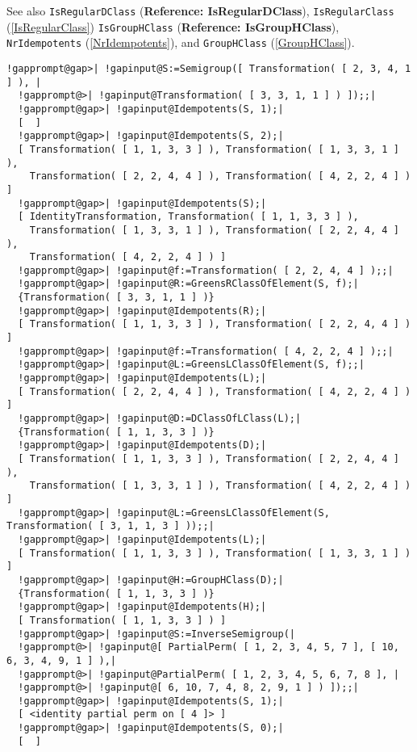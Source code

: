 \documentclass[a4paper,11pt]{report}
\begin{document}
{{{ See also \texttt{IsRegularDClass} (\textbf{Reference: IsRegularDClass}), \texttt{IsRegularClass} (\ref{IsRegularClass}) \texttt{IsGroupHClass} (\textbf{Reference: IsGroupHClass}), \texttt{NrIdempotents} (\ref{NrIdempotents}), and \texttt{GroupHClass} (\ref{GroupHClass}). 
\begin{Verbatim}[commandchars=!@|,fontsize=\small,frame=single,label=Example]
  !gapprompt@gap>| !gapinput@S:=Semigroup([ Transformation( [ 2, 3, 4, 1 ] ), |
  !gapprompt@>| !gapinput@Transformation( [ 3, 3, 1, 1 ] ) ]);;|
  !gapprompt@gap>| !gapinput@Idempotents(S, 1);|
  [  ]
  !gapprompt@gap>| !gapinput@Idempotents(S, 2);|
  [ Transformation( [ 1, 1, 3, 3 ] ), Transformation( [ 1, 3, 3, 1 ] ), 
    Transformation( [ 2, 2, 4, 4 ] ), Transformation( [ 4, 2, 2, 4 ] ) ]
  !gapprompt@gap>| !gapinput@Idempotents(S);|
  [ IdentityTransformation, Transformation( [ 1, 1, 3, 3 ] ), 
    Transformation( [ 1, 3, 3, 1 ] ), Transformation( [ 2, 2, 4, 4 ] ), 
    Transformation( [ 4, 2, 2, 4 ] ) ]
  !gapprompt@gap>| !gapinput@f:=Transformation( [ 2, 2, 4, 4 ] );;|
  !gapprompt@gap>| !gapinput@R:=GreensRClassOfElement(S, f);|
  {Transformation( [ 3, 3, 1, 1 ] )}
  !gapprompt@gap>| !gapinput@Idempotents(R);|
  [ Transformation( [ 1, 1, 3, 3 ] ), Transformation( [ 2, 2, 4, 4 ] ) ]
  !gapprompt@gap>| !gapinput@f:=Transformation( [ 4, 2, 2, 4 ] );;|
  !gapprompt@gap>| !gapinput@L:=GreensLClassOfElement(S, f);;|
  !gapprompt@gap>| !gapinput@Idempotents(L);|
  [ Transformation( [ 2, 2, 4, 4 ] ), Transformation( [ 4, 2, 2, 4 ] ) ]
  !gapprompt@gap>| !gapinput@D:=DClassOfLClass(L);|
  {Transformation( [ 1, 1, 3, 3 ] )}
  !gapprompt@gap>| !gapinput@Idempotents(D);|
  [ Transformation( [ 1, 1, 3, 3 ] ), Transformation( [ 2, 2, 4, 4 ] ), 
    Transformation( [ 1, 3, 3, 1 ] ), Transformation( [ 4, 2, 2, 4 ] ) ]
  !gapprompt@gap>| !gapinput@L:=GreensLClassOfElement(S, Transformation( [ 3, 1, 1, 3 ] ));;|
  !gapprompt@gap>| !gapinput@Idempotents(L);|
  [ Transformation( [ 1, 1, 3, 3 ] ), Transformation( [ 1, 3, 3, 1 ] ) ]
  !gapprompt@gap>| !gapinput@H:=GroupHClass(D);|
  {Transformation( [ 1, 1, 3, 3 ] )}
  !gapprompt@gap>| !gapinput@Idempotents(H);|
  [ Transformation( [ 1, 1, 3, 3 ] ) ]
  !gapprompt@gap>| !gapinput@S:=InverseSemigroup(|
  !gapprompt@>| !gapinput@[ PartialPerm( [ 1, 2, 3, 4, 5, 7 ], [ 10, 6, 3, 4, 9, 1 ] ),|
  !gapprompt@>| !gapinput@PartialPerm( [ 1, 2, 3, 4, 5, 6, 7, 8 ], |
  !gapprompt@>| !gapinput@[ 6, 10, 7, 4, 8, 2, 9, 1 ] ) ]);;|
  !gapprompt@gap>| !gapinput@Idempotents(S, 1);|
  [ <identity partial perm on [ 4 ]> ]
  !gapprompt@gap>| !gapinput@Idempotents(S, 0);|
  [  ]
\end{Verbatim}
 }

}}
\end{document}
